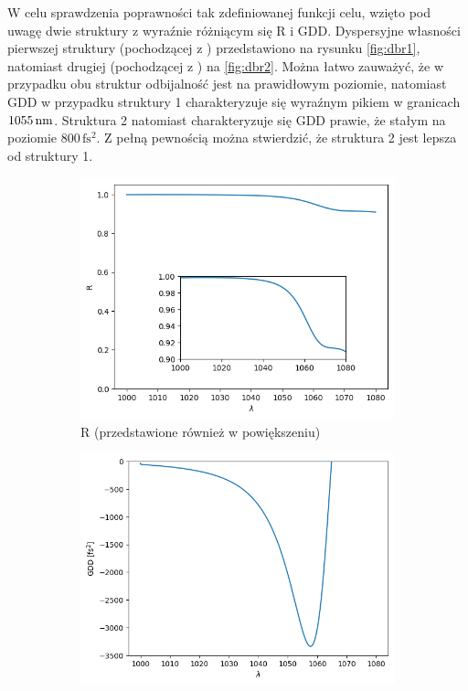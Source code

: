 W celu sprawdzenia poprawności tak zdefiniowanej funkcji celu, wzięto pod uwagę dwie struktury z wyraźnie różniącym się R i GDD. Dyspersyjne własności pierwszej struktury (pochodzącej z \cite{dbr1}) przedstawiono na rysunku \ref{fig:dbr1}, natomiast drugiej (pochodzącej z \cite{dbr2}) na \ref{fig:dbr2}. Można łatwo zauważyć, że w przypadku obu struktur odbijalność jest na prawidłowym poziomie, natomiast GDD w przypadku struktury 1 charakteryzuje się wyraźnym pikiem w granicach $1055\,\mathrm{nm}$. Struktura 2 natomiast charakteryzuje się GDD prawie, że stałym na poziomie $800\,\mathrm{fs^2}$. Z pełną pewnością można stwierdzić, że struktura 2 jest lepsza od struktury 1.

\begin{figure}
    \centering
    \begin{subfigure}[b]{0.46\textwidth}
        \includegraphics[width=\linewidth]{figures/funkcjacelu/result_Rdbr.png}
        \caption{R (przedstawione również w powiększeniu)}
    \end{subfigure}
       \begin{subfigure}[b]{0.49\textwidth}
        \includegraphics[width=\linewidth]{figures/funkcjacelu/result_gdddbr.png}

\end{subfigure}
\end{figure}
